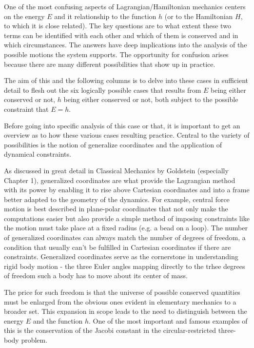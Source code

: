 \documentclass[12pt]{article}
\begin{document}
One of the most confusing aspects of Lagrangian/Hamiltonian mechanics centers on the energy $E$ and it relationship to the function $h$ (or to the Hamiltonian $H$, to which it is close related).  The key questions are to what extent these two terms can be identified with each other and which of them is conserved and in which circumstances.  The answers have deep implications into the analysis of the possible motions the system supports.  The opportunity for confusion arises because there are many different possibilities that show up in practice.  

The aim of this and the following columns is to delve into these cases in sufficient detail to flesh out the six logically possible cases that results from $E$ being either conserved or not, $h$ being either conserved or not, both subject to the possible constraint that $E=h$.  

Before going into specific analysis of this case or that, it is important to get an overview as to how these various cases resulting practice.  Central to the variety of possibilities is the notion of generalize coordinates and the application of dynamical constraints.  

As discussed in great detail in Classical Mechanics by Goldstein (especially Chapter 1), generalized coordinates are what provide the Lagrangian method with its power by enabling it to rise above Cartesian coordinates and into a frame better adapted to the geometry of the dynamics.  For example, central force motion is best described in plane-polar coordinates that not only make the computations easier but also provide a simple method of imposing constraints like the motion must take place at a fixed radius (e.g. a bead on a loop).  The number of generalized coordinates can always match the number of degrees of freedom, a condition that usually can't be fulfilled in Cartesian coordinates if there are constraints.  Generalized coordinates serve as the cornerstone in understanding rigid body motion - the three Euler angles mapping directly to the trhee degrees of freedom such a body has to move about its center of mass.

The price for such freedom is that the universe of possible conserved quantities must be enlarged from the obvious ones evident in elementary mechanics to a broader set.  This expansion in scope leads to the need to distinguish between the energy $E$ and the function $h$.  One of the most important and famous examples of this is the conservation of the Jacobi constant in the circular-restricted three-body problem.
\end{document}

